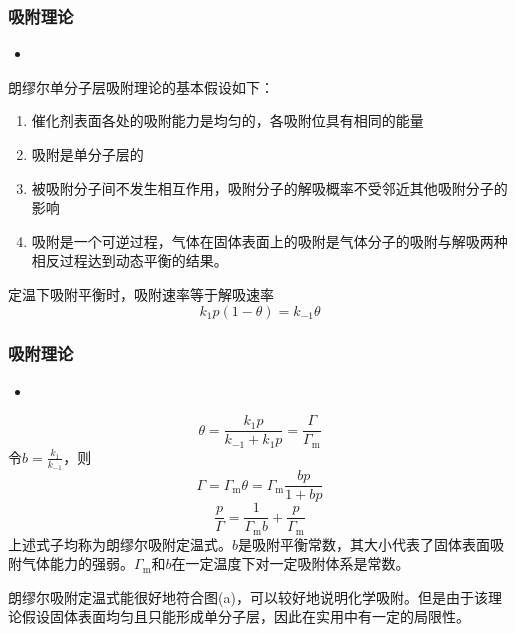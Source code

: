 \begin{frame}
    \frametitle{吸附理论}

    \begin{itemize}
        \item[2.] 
    \end{itemize}

    朗缪尔单分子层吸附理论的基本假设如下：
    \begin{enumerate}
        \item 催化剂表面各处的吸附能力是均匀的，各吸附位具有相同的能量        
        \item 吸附是单分子层的
        \item 被吸附分子间不发生相互作用，吸附分子的解吸概率不受邻近其他吸附分子的影响
        \item 吸附是一个可逆过程，气体在固体表面上的吸附是气体分子的吸附与解吸两种相反过程达到动态平衡的结果。
    \end{enumerate}
    定温下吸附平衡时，吸附速率等于解吸速率
    \[
        k_1p(1-\theta) = k_{-1}\theta
    \]

\end{frame}


\begin{frame}
    \frametitle{吸附理论}

    \begin{itemize}
        \item[2.] 
    \end{itemize}
    \[
        \theta=\frac{k_{1} p}{k_{-1}+k_{1} p} = \frac{\varGamma}{\varGamma_{\mathrm{m}}}
    \]
    令$b = \frac{k_1}{k_{-1}}$，则
    \[
        \varGamma=\varGamma_{\mathrm{m}} \theta=\varGamma_{\mathrm{m}} \frac{b p}{1+b p}
    \]
    \[
        \frac{p}{\varGamma}=\frac{1}{\varGamma_{\mathrm{m}} b}+\frac{p}{\varGamma_{\mathrm{m}}}
    \]
    上述式子均称为朗缪尔吸附定温式。$b$是吸附平衡常数，其大小代表了固体表面吸附气体能力的强弱。$\varGamma_{\mathrm{m}}$和$b$在一定温度下对一定吸附体系是常数。

    朗缪尔吸附定温式能很好地符合图(a)，可以较好地说明化学吸附。但是由于该理论假设固体表面均匀且只能形成单分子层，因此在实用中有一定的局限性。

\end{frame}



